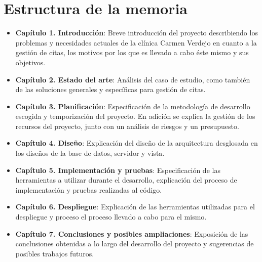 \section{Estructura de la memoria}
\begin{itemize}
    \item \textbf{Capítulo 1. Introducción}: Breve introducción del proyecto describiendo los problemas y necesidades actuales de la clínica Carmen Verdejo en cuanto a la gestión de citas, los motivos por los que es llevado a cabo éste mismo y sus objetivos.
    \item \textbf{Capítulo 2. Estado del arte}: Análisis del caso de estudio, como también de las soluciones generales y específicas para gestión de citas.
    \item \textbf{Capítulo 3. Planificación}: Especificación de la metodología de desarrollo escogida y temporización del proyecto. En adición se explica la gestión de los recursos del proyecto, junto con un análisis de riesgos y un presupuesto.
    \item \textbf{Capítulo 4. Diseño}: Explicación del diseño de la arquitectura desglosada en los diseños de la base de datos, servidor y vista.  
    \item \textbf{Capítulo 5. Implementación y pruebas}: Especificación de las herramientas a utilizar durante el desarrollo, explicación del proceso de implementación y pruebas realizadas al código.
    \item \textbf{Capítulo 6. Despliegue}: Explicación de las herramientas utilizadas para el despliegue y proceso el proceso llevado a cabo para el mismo.
    \item \textbf{Capítulo 7. Conclusiones y posibles ampliaciones}: Exposición de las conclusiones obtenidas a lo largo del desarrollo del proyecto y sugerencias de posibles trabajos futuros.
\end{itemize}